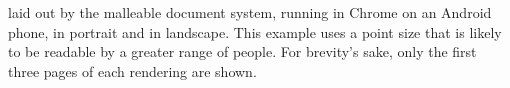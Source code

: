 \begin{center}
\end{center}
 

\clearpage

\cite{Pinkney2011} laid out by the malleable document system, running in Chrome on an Android phone, in portrait and in landscape. This example uses a point size that is likely to be readable by a greater range of people. For brevity's sake, only the first three pages of each rendering are shown.

